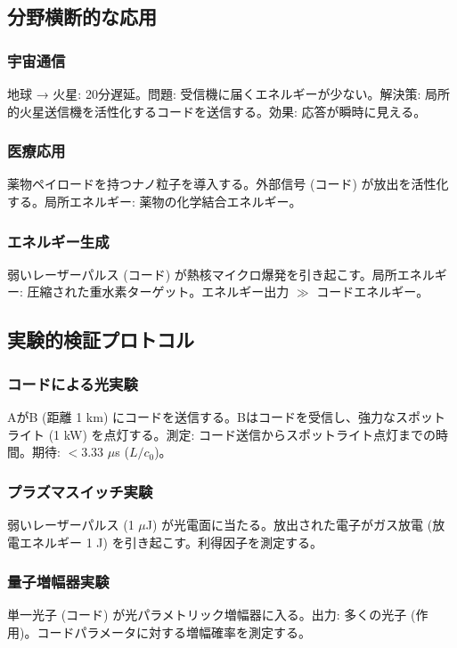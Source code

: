 \documentclass[11pt,a4paper]{article}
\begin{document}
	\subsection{分野横断的な応用}
	
	\subsubsection{宇宙通信}
	地球 → 火星: 20分遅延。問題: 受信機に届くエネルギーが少ない。解決策: 局所的火星送信機を活性化するコードを送信する。効果: 応答が瞬時に見える。
	
	\subsubsection{医療応用}
	薬物ペイロードを持つナノ粒子を導入する。外部信号 (コード) が放出を活性化する。局所エネルギー: 薬物の化学結合エネルギー。
	
	\subsubsection{エネルギー生成}
	弱いレーザーパルス (コード) が熱核マイクロ爆発を引き起こす。局所エネルギー: 圧縮された重水素ターゲット。エネルギー出力 $\gg$ コードエネルギー。
	
	\subsection{実験的検証プロトコル}
	
	\subsubsection{コードによる光実験}
	AがB (距離 1 km) にコードを送信する。Bはコードを受信し、強力なスポットライト (1 kW) を点灯する。測定: コード送信からスポットライト点灯までの時間。期待: $< 3.33$ $\mu$s ($L/c_0$)。
	
	\subsubsection{プラズマスイッチ実験}
	弱いレーザーパルス (1 $\mu$J) が光電面に当たる。放出された電子がガス放電 (放電エネルギー 1 J) を引き起こす。利得因子を測定する。
	
	\subsubsection{量子増幅器実験}
	単一光子 (コード) が光パラメトリック増幅器に入る。出力: 多くの光子 (作用)。コードパラメータに対する増幅確率を測定する。
	
\end{document}
